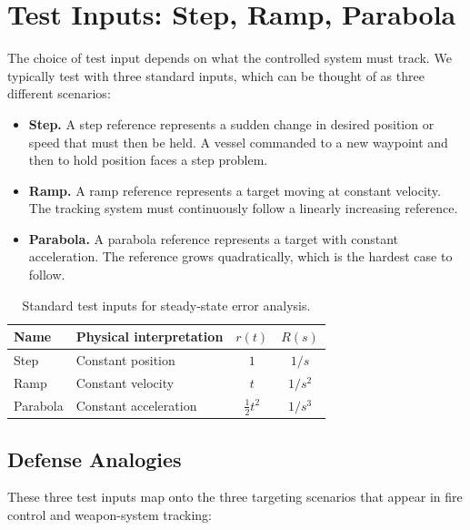 \documentclass[12pt]{article}
\begin{document}
\section{Test Inputs: Step, Ramp, Parabola}
\label{sec:inputs}

The choice of test input depends on what the controlled system must track.  We typically test with three standard inputs, which can be thought of as three different scenarios:
\begin{itemize}
  \item \textbf{Step.}  A step reference represents a sudden change in desired position or speed that must then be held.  A vessel commanded to a new waypoint and then to hold position faces a step problem.

  \item \textbf{Ramp.}  A ramp reference represents a target moving at constant velocity.  The tracking system must continuously follow a linearly increasing reference.

  \item \textbf{Parabola.}  A parabola reference represents a target with constant acceleration.  The reference grows quadratically, which is the hardest case to follow.
\end{itemize}

\begin{table}[htbp]
\centering
\caption{Standard test inputs for steady-state error analysis.}
\label{tab:inputs}
\begin{tabular}{llcc}
\toprule
Name     & Physical interpretation & $r(t)$             & $R(s)$   \\
\midrule
Step     & Constant position       & $1$                & $1/s$    \\
Ramp     & Constant velocity       & $t$                & $1/s^2$  \\
Parabola & Constant acceleration   & $\frac{1}{2}t^2$   & $1/s^3$  \\
\bottomrule
\end{tabular}
\end{table}

\subsection{Defense Analogies}

These three test inputs map  onto the three targeting
scenarios that appear in fire control and weapon-system tracking:
\end{document}
